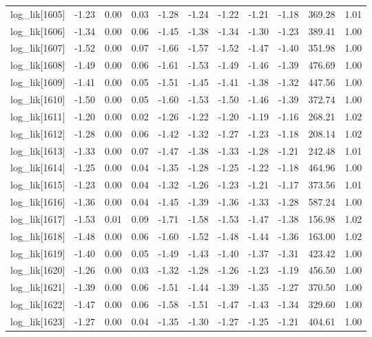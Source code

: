 \begin{table}[ht]
\begin{tabular}{rrrrrrrrrrr}
  log\_lik[1605] & -1.23 & 0.00 & 0.03 & -1.28 & -1.24 & -1.22 & -1.21 & -1.18 & 369.28 & 1.01 \\ 
  log\_lik[1606] & -1.34 & 0.00 & 0.06 & -1.45 & -1.38 & -1.34 & -1.30 & -1.23 & 389.41 & 1.00 \\ 
  log\_lik[1607] & -1.52 & 0.00 & 0.07 & -1.66 & -1.57 & -1.52 & -1.47 & -1.40 & 351.98 & 1.00 \\ 
  log\_lik[1608] & -1.49 & 0.00 & 0.06 & -1.61 & -1.53 & -1.49 & -1.46 & -1.39 & 476.69 & 1.00 \\ 
  log\_lik[1609] & -1.41 & 0.00 & 0.05 & -1.51 & -1.45 & -1.41 & -1.38 & -1.32 & 447.56 & 1.00 \\ 
  log\_lik[1610] & -1.50 & 0.00 & 0.05 & -1.60 & -1.53 & -1.50 & -1.46 & -1.39 & 372.74 & 1.00 \\ 
  log\_lik[1611] & -1.20 & 0.00 & 0.02 & -1.26 & -1.22 & -1.20 & -1.19 & -1.16 & 268.21 & 1.02 \\ 
  log\_lik[1612] & -1.28 & 0.00 & 0.06 & -1.42 & -1.32 & -1.27 & -1.23 & -1.18 & 208.14 & 1.02 \\ 
  log\_lik[1613] & -1.33 & 0.00 & 0.07 & -1.47 & -1.38 & -1.33 & -1.28 & -1.21 & 242.48 & 1.01 \\ 
  log\_lik[1614] & -1.25 & 0.00 & 0.04 & -1.35 & -1.28 & -1.25 & -1.22 & -1.18 & 464.96 & 1.00 \\ 
  log\_lik[1615] & -1.23 & 0.00 & 0.04 & -1.32 & -1.26 & -1.23 & -1.21 & -1.17 & 373.56 & 1.01 \\ 
  log\_lik[1616] & -1.36 & 0.00 & 0.04 & -1.45 & -1.39 & -1.36 & -1.33 & -1.28 & 587.24 & 1.00 \\ 
  log\_lik[1617] & -1.53 & 0.01 & 0.09 & -1.71 & -1.58 & -1.53 & -1.47 & -1.38 & 156.98 & 1.02 \\ 
  log\_lik[1618] & -1.48 & 0.00 & 0.06 & -1.60 & -1.52 & -1.48 & -1.44 & -1.36 & 163.00 & 1.02 \\ 
  log\_lik[1619] & -1.40 & 0.00 & 0.05 & -1.49 & -1.43 & -1.40 & -1.37 & -1.31 & 423.42 & 1.00 \\ 
  log\_lik[1620] & -1.26 & 0.00 & 0.03 & -1.32 & -1.28 & -1.26 & -1.23 & -1.19 & 456.50 & 1.00 \\ 
  log\_lik[1621] & -1.39 & 0.00 & 0.06 & -1.51 & -1.44 & -1.39 & -1.35 & -1.27 & 370.50 & 1.00 \\ 
  log\_lik[1622] & -1.47 & 0.00 & 0.06 & -1.58 & -1.51 & -1.47 & -1.43 & -1.34 & 329.60 & 1.00 \\ 
  log\_lik[1623] & -1.27 & 0.00 & 0.04 & -1.35 & -1.30 & -1.27 & -1.25 & -1.21 & 404.61 & 1.00 \\ 

\end{tabular}
\end{table}
